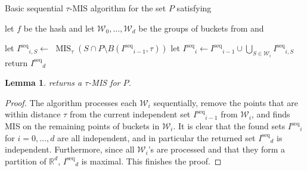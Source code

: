 \documentclass[11pt,letterpaper]{article}
\theoremstyle{plain}
\newtheorem{lemma}[theorem]{Lemma}
\theoremstyle{definition}
\theoremstyle{remark}
\DeclareMathOperator{\MIS}{MIS}
\newcommand{\Iseq}{\ensuremath{I^{\mathrm{seq}}}\xspace}
\begin{document}
\begin{algorithm}
\caption{Basic sequential $\tau$-MIS algorithm for the set $P$ satisfying }
\label{alg:seq_MIS}
\begin{algorithmic}[1]


    \State let $f$ be the hash and let $\mathcal{W}_0, \ldots, \mathcal{W}_d$ be the groups of buckets from  and 
    
      
    \State let $\Iseq_{i, S} \gets$ $\MIS_\tau(S \cap P \setminus B(\Iseq_{i - 1}, \tau))$
    \label{line:Iseq_MIS_def}
    \Comment{define $\Iseq_{-1} \gets \emptyset$}
    \EndFor
    \State let $\Iseq_i \gets \Iseq_{i - 1} \cup \bigcup_{S \in \mathcal{W}_i}\Iseq_{i, S}$
    \label{line:Iseq_i_def}
    \EndFor
    \State return $\Iseq_d$
    \label{line:Iseq_d_def}
\end{algorithmic}
\end{algorithm}



















\begin{lemma}
\label{lemma:seq_MIS_correctness}
     returns a $\tau$-MIS for $P$. 
\end{lemma}
\begin{proof}
    The algorithm processes each $\mathcal{W}_{i}$ sequentially, remove the points that are within distance $\tau$ from the current independent set $\Iseq_{i-1}$ from $\mathcal{W}_{i}$, and finds MIS on the remaining points of buckets in $\mathcal{W}_{i}$. 
    It is clear that the found sets $\Iseq_{i}$ for $i= 0, \ldots, d$ are all independent, and in particular the returned set $\Iseq_{d}$ is independent. 
    Furthermore, since all $\mathcal{W}_{i}$'s are processed and that they form a partition of $\mathbb{R}^{d}$, $\Iseq_{d}$ is maximal. 
    This finishes the proof. 
\end{proof}
\end{document}
